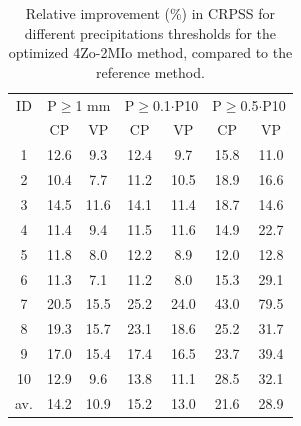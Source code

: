 \documentclass[review]{elsarticle}
\begin{document}
\begin{table}[t]
	\caption{Relative improvement (\%) in CRPSS for different precipitations thresholds for the optimized 4Zo-2MIo method, compared to the reference method.}
	\footnotesize
	\begin{center}
		\begin{tabular}{ccccccc}
			\hline 
			ID & \multicolumn{2}{c}{P\(\geq\)1 mm} & \multicolumn{2}{c}{P\(\geq\)0.1\(\cdot\)P10} & \multicolumn{2}{c}{P\(\geq\)0.5\(\cdot\)P10} \\  
			& CP & VP & CP & VP & CP & VP \\ 
			\hline 
			1 & 12.6 & 9.3 & 12.4 & 9.7 & 15.8 & 11.0 \\
			2 & 10.4 & 7.7 & 11.2 & 10.5 & 18.9 & 16.6 \\ 
			3 & 14.5 & 11.6 & 14.1 & 11.4 & 18.7 & 14.6 \\ 
			4 & 11.4 & 9.4 & 11.5 & 11.6 & 14.9 & 22.7 \\ 
			5 & 11.8 & 8.0 & 12.2 & 8.9 & 12.0 & 12.8 \\ 
			6 & 11.3 & 7.1 & 11.2 & 8.0 & 15.3 & 29.1 \\ 
			7 & 20.5 & 15.5 & 25.2 & 24.0 & 43.0 & 79.5 \\
			8 & 19.3 & 15.7 & 23.1 & 18.6 & 25.2 & 31.7 \\ 
			9 & 17.0 & 15.4 & 17.4 & 16.5 & 23.7 & 39.4 \\ 
			10 & 12.9 & 9.6 & 13.8 & 11.1 & 28.5 & 32.1 \\ 
			\hline 
			av. & 14.2 & 10.9 & 15.2 & 13.0 & 21.6 & 28.9 \\ 
			\hline 
		\end{tabular} 
	\end{center}
	\label{table:scores_thresholds_4Zo-2MIo}
\end{table}

	
	
\end{document}
